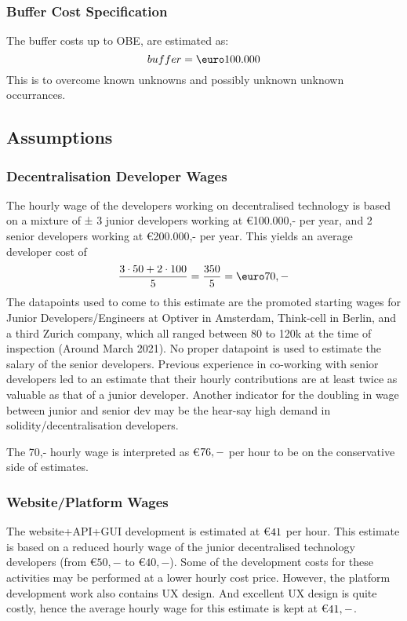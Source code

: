 \subsubsection{Buffer Cost Specification}\label{subsubsec:buffer_cost_specification}
The buffer costs up to OBE, are estimated as:
\begin{equation}
	buffer=\text{\euro}100.000
	\label{eq:buffer_costs}
\end{equation}
This is to overcome known unknowns and possibly unknown unknown occurrances.

\subsection{Assumptions}\label{subsec:assumptions}
\subsubsection{Decentralisation Developer Wages}
The hourly wage of the developers working on decentralised technology is based on a mixture of ± 3 junior developers working at \euro 100.000,- per year, and 2 senior developers working at \euro 200.000,- per year. This yields an average developer cost of
\begin{equation}
	\frac{3\cdot 50+2\cdot 100}{5}=\frac{350}{5}=\textup{\euro}70,-
\end{equation}
The datapoints used to come to this estimate are the promoted starting wages for Junior Developers/Engineers at Optiver in Amsterdam, Think-cell in Berlin, and a third Zurich company, which all ranged between 80 to 120k at the time of inspection (Around March 2021). No proper datapoint is used to estimate the salary of the senior developers. Previous experience in co-working with senior developers led to an estimate that their hourly contributions are at least twice as valuable as that of a junior developer. Another indicator for the doubling in wage between junior and senior dev may be the hear-say high demand in solidity/decentralisation developers.

The 70,- hourly wage is interpreted as \euro$76,-$ per hour to be on the conservative side of estimates.
\subsubsection{Website/Platform Wages}
The website+API+GUI development is estimated at \euro$41$ per hour. This estimate is based on a reduced hourly wage of the junior decentralised technology developers (from \euro$50,-$ to \euro$40,-$). Some of the development costs for these activities may be performed at a lower hourly cost price. However, the platform development work also contains UX design. And excellent UX design is quite costly, hence the average hourly wage for this estimate is kept at \euro$41,-$.

